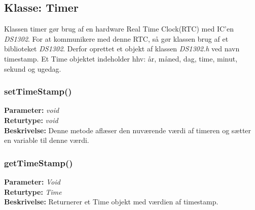 \subsection{Klasse: Timer}
Klassen timer gør brug af en hardware Real Time Clock(RTC) med IC’en \textit{DS1302}. For at kommunikere med denne RTC, så gør klassen brug af et biblioteket \textit{DS1302}. Derfor oprettet et objekt af klassen \textit{DS1302.h} ved navn timestamp. Et Time objektet indeholder hhv: år, måned, dag, time, minut, sekund og ugedag. 

\subsubsection{setTimeStamp()}
\textbf{Parameter: } \textit{void}
\\ \textbf{Returtype: } \textit{void}
\\ \textbf{Beskrivelse: } Denne metode aflæser den nuværende værdi af timeren og sætter en variable til denne værdi. 

\subsubsection{getTimeStamp()}
\textbf{Parameter: } \textit{Void}
\\ \textbf{Returtype: } \textit{Time}
\\ \textbf{Beskrivelse: } Returnerer et Time objekt med værdien af timestamp. 

